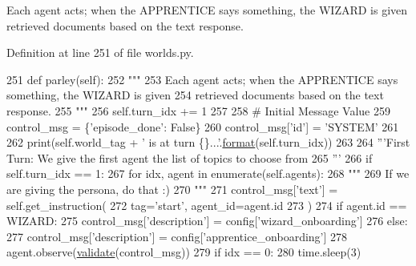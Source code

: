 \begin{DoxyVerb}Each agent acts; when the APPRENTICE says something, the WIZARD is given
retrieved documents based on the text response.
\end{DoxyVerb}
 

Definition at line 251 of file worlds.\+py.


\begin{DoxyCode}
251     \textcolor{keyword}{def }parley(self):
252         \textcolor{stringliteral}{"""}
253 \textcolor{stringliteral}{        Each agent acts; when the APPRENTICE says something, the WIZARD is given}
254 \textcolor{stringliteral}{        retrieved documents based on the text response.}
255 \textcolor{stringliteral}{        """}
256         self.turn\_idx += 1
257 
258         \textcolor{comment}{# Initial Message Value}
259         control\_msg = \{\textcolor{stringliteral}{'episode\_done'}: \textcolor{keyword}{False}\}
260         control\_msg[\textcolor{stringliteral}{'id'}] = \textcolor{stringliteral}{'SYSTEM'}
261 
262         print(self.world\_tag + \textcolor{stringliteral}{' is at turn \{\}...'}.\hyperlink{namespaceparlai_1_1chat__service_1_1services_1_1messenger_1_1shared__utils_a32e2e2022b824fbaf80c747160b52a76}{format}(self.turn\_idx))
263 
264         \textcolor{stringliteral}{'''First Turn: We give the first agent the list of topics to choose from}
265 \textcolor{stringliteral}{        '''}
266         \textcolor{keywordflow}{if} self.turn\_idx == 1:
267             \textcolor{keywordflow}{for} idx, agent \textcolor{keywordflow}{in} enumerate(self.agents):
268                 \textcolor{stringliteral}{"""}
269 \textcolor{stringliteral}{                If we are giving the persona, do that :)}
270 \textcolor{stringliteral}{                """}
271                 control\_msg[\textcolor{stringliteral}{'text'}] = self.get\_instruction(
272                     tag=\textcolor{stringliteral}{'start'}, agent\_id=agent.id
273                 )
274                 \textcolor{keywordflow}{if} agent.id == WIZARD:
275                     control\_msg[\textcolor{stringliteral}{'description'}] = config[\textcolor{stringliteral}{'wizard\_onboarding'}]
276                 \textcolor{keywordflow}{else}:
277                     control\_msg[\textcolor{stringliteral}{'description'}] = config[\textcolor{stringliteral}{'apprentice\_onboarding'}]
278                 agent.observe(\hyperlink{namespaceparlai_1_1core_1_1worlds_afc3fad603b7bce41dbdc9cdc04a9c794}{validate}(control\_msg))
279                 \textcolor{keywordflow}{if} idx == 0:
280                     time.sleep(3)

\end{DoxyCode}
